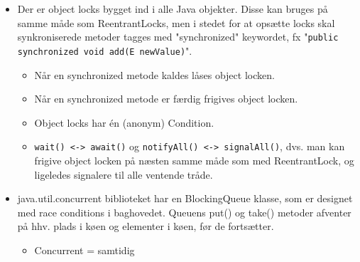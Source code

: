 \begin{itemize}
  \item Der er object locks bygget ind i alle Java objekter. Disse kan bruges på samme måde som ReentrantLocks, men i stedet for at opsætte locks skal synkroniserede metoder tagges med "synchronized" keywordet, fx "\verb|public synchronized void add(E newValue)|".
  \begin{itemize}
    \item Når en synchronized metode kaldes låses object locken.
    \item Når en synchronized metode er færdig frigives object locken.
    \item Object locks har én (anonym) Condition.
    \item \verb|wait() <-> await()| og \verb|notifyAll() <-> signalAll()|, dvs. man kan frigive object locken på næsten samme måde som med ReentrantLock, og ligeledes signalere til alle ventende tråde.
  \end{itemize}

  \item java.util.concurrent biblioteket har en BlockingQueue klasse, som er designet med race conditions i baghovedet. Queuens put() og take() metoder afventer på hhv. plads i køen og elementer i køen, før de fortsætter.
  \begin{itemize}
    \item Concurrent = samtidig
  \end{itemize}

\end{itemize}


